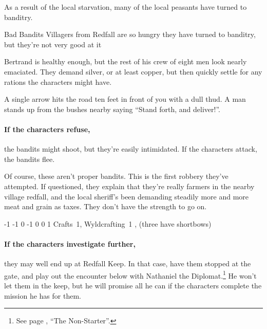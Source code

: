 \begin{multicols}{2}
As a result of the local starvation, many of the local peasants have turned to banditry.

{\N Bad Bandits}%
{Villagers from Redfall are so hungry they have turned to banditry, but they're not very good at it}%

Bertrand is healthy enough, but the rest of his crew of eight men look nearly emaciated.
They demand silver, or at least copper, but then quickly settle for any rations the characters might have.

\begin{boxtext}

  A single arrow hits the road ten feet in front of you with a dull thud.
  A man stands up from the bushes nearby saying ``Stand forth, and deliver!''.

\end{boxtext}

\paragraph{If the characters refuse,}
the bandits might shoot, but they're easily intimidated.  If the characters attack, the bandits flee.

Of course, these aren't proper bandits.
This is the first robbery they've attempted.
If questioned, they explain that they're really farmers in the nearby village \gls{redfall}, and the local sheriff's been demanding steadily more and more meat and grain as taxes.
They don't have the strength to go on.


  {-1}%
  {-1}%
  {{0}%
  {-1}%
  {0}}%
  {0}%
  {1}%
  {Crafts~1, Wyldcrafting~1}%
  {\Dagger, (three have shortbows)}%
  {}

\paragraph{If the characters investigate further,}
they may well end up at Redfall Keep.
In that case, have them stopped at the gate, and play out the encounter below with Nathaniel the Diplomat.\footnote{See page \pageref{nonstarter}, ``The Non-Starter''.}
He won't let them in the keep, but he will promise all he can if the characters complete the mission he has for them.


\end{multicols}
